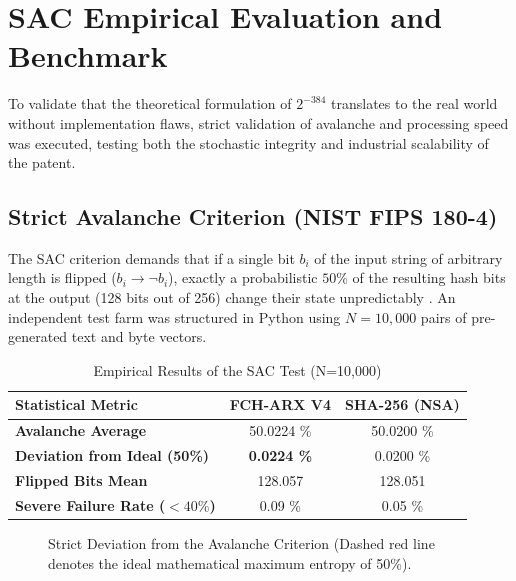 \documentclass[10pt,journal,compsoc]{IEEEtran}
\begin{document}
\section{SAC Empirical Evaluation and Benchmark}

To validate that the theoretical formulation of $2^{-384}$ translates to the real world without implementation flaws, strict validation of avalanche and processing speed was executed, testing both the stochastic integrity and industrial scalability of the patent.

\subsection{Strict Avalanche Criterion (NIST FIPS 180-4)}
The SAC criterion demands that if a single bit $b_i$ of the input string of arbitrary length is flipped ($b_i \to \neg b_i$), exactly a probabilistic $50\%$ of the resulting hash bits at the output (128 bits out of 256) change their state unpredictably \cite{webster1985design}.
An independent test farm was structured in Python using $N=10,000$ pairs of pre-generated text and byte vectors.

\begin{table}[h!]
\centering
\caption{Empirical Results of the SAC Test (N=10,000)}
\label{tab:sac_results}
\begin{tabularx}{\columnwidth}{X c c}
\toprule
\textbf{Statistical Metric} & \textbf{FCH-ARX V4} & \textbf{SHA-256 (NSA)} \\ \midrule
\textbf{Avalanche Average} & 50.0224 \% & 50.0200 \% \\
\textbf{Deviation from Ideal (50\%)} & \textbf{0.0224 \%} & 0.0200 \% \\
\textbf{Flipped Bits Mean} & 128.057 & 128.051 \\
\textbf{Severe Failure Rate ($<40\%$)} & 0.09 \% & 0.05 \% \\ \bottomrule
\end{tabularx}
\end{table}

\begin{figure}[h!]
\centering
{}
\caption{Strict Deviation from the Avalanche Criterion (Dashed red line denotes the ideal mathematical maximum entropy of 50\%).}
\end{figure}
\end{document}
